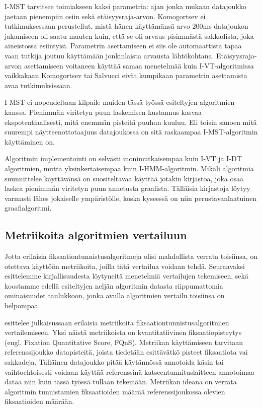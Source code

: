 I-MST tarvitsee toimiakseen kaksi parametria: ajan jonka mukaan datajoukko jaetaan pienempiin osiin sekä etäisyysraja-arvon. Komogortsev ei tutkimuksessaan perustellut, mistä hänen käyttämänsä arvo 200ms datajoukon jakamiseen oli saatu muuten kuin, että se oli arvaus pisimmästä sakkadista, joka aineistossa esiintyisi. Parametrin asettamiseen ei siis ole automaattista tapaa vaan tutkija joutuu käyttämään jonkinlaista arvausta lähtökohtana. Etäisyysraja-arvon asettamiseen voitaneen käyttää samaa menetelmää kuin I-VT-algoritmissa vaikkakaan Komogortsev tai Salvucci eivät kumpikaan parametrin asettamista avaa tutkimuksissaan.

I-MST ei nopeudeltaan kilpaile muiden tässä työssä esiteltyjen algoritmien kanssa. Pienimmän viritetyn puun laskemisen kustannus kasvaa ekspotentiaalisesti, mitä enemmän pisteitä puuhun kuuluu. Eli toisin sanoen mitä suurempi näytteenottotaajuus datajoukossa on sitä raskaampaa I-MST-algoritmin käyttäminen on. 

Algoritmin implementointi on selvästi monimutkaisempaa kuin I-VT ja I-DT algoritmien, mutta yksinkertaisempaa kuin I-HMM-algoritmin. Mikäli algoritmia suunnittelee käyttävänsä on suositeltavaa käyttää jotakin kirjastoa, joka osaa laskea pienimmän viritetyn puun annetusta graafista. Tälläisia kirjastoja löytyy varmasti lähes jokaiselle ympäristölle, koska kyseessä on niin perustavanlaatuinen graafialgoritmi.



\subsection{Metriikoita algoritmien vertailuun}
Jotta erilaisia fiksaationtunnistusalgoritmeja olisi mahdollista verrata toisiinsa, on otettava käyttöön metriikoita, joilla tätä vertailua voidaan tehdä. Seuraavaksi esittelemme kirjallisuudesta löytyneitä menetelmiä vertailujen tekemiseen, sekä koostamme edellä esiteltyjen neljän algoritmin datasta riippumattomia ominaisuudet taulukkoon, jonka avulla algoritmien vertailu toisiinsa on helpompaa.

\citet[s. 4]{komogortsev2010} esittelee julkaisussaan erilaisia metriikoita fiksaationtunnistusalgoritmien vertailemiseen. Yksi näistä metriikoista on kvantitatiivinen fiksaatiopisteytys (engl. Fixation Quantitative Score, FQnS). Metriikan käyttämiseen tarvitaan referenssijoukko datapisteitä, joista tiedetään esittävätkö pisteet fiksaatiota vai sakkadeja. Tälläinen datajoukko pitää käytännössä annotoida käsin tai vaihtoehtoisesti voidaan käyttää referenssinä katseentunnituslaitteen annotoimaa dataa niin kuin tässä työssä tullaan tekemään. Metriikan ideana on verrata algoritmin tunnistamien fiksaatioiden määrää referenssijoukossa olevien fiksaatioiden määrään.


